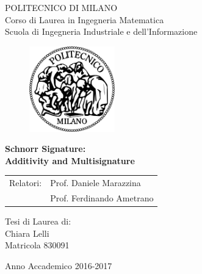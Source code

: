 \thispagestyle{empty}
\vspace*{-1.5cm} \bfseries{
\begin{center}
  \large
  POLITECNICO DI MILANO\\
  \medskip
  \normalsize
 Corso di Laurea in Ingegneria Matematica\\
  Scuola di Ingegneria Industriale e dell’Informazione\\
  \medskip
  
  \begin{figure}[htbp]
    \begin{center}
      \includegraphics[width=3.7cm]{logopm.png}
    \end{center}
  \end{figure}
  \vspace*{0.3cm} \huge



  \textbf{Schnorr Signature: \\ Additivity and Multisignature}\\



\end{center}
\vspace*{8.0cm} \large
\begin{flushleft}

\begin{tabular}{ll}
	Relatori:& Prof. Daniele Marazzina\\
	& Prof. Ferdinando Ametrano\\
\end{tabular}


\end{flushleft}
\vspace*{1.5cm}
\begin{flushright}


  Tesi di Laurea di:\\ Chiara Lelli \\Matricola 830091


\end{flushright}
\vspace*{0.5cm}
\begin{center}



  Anno Accademico 2016-2017
\end{center} \clearpage
}
